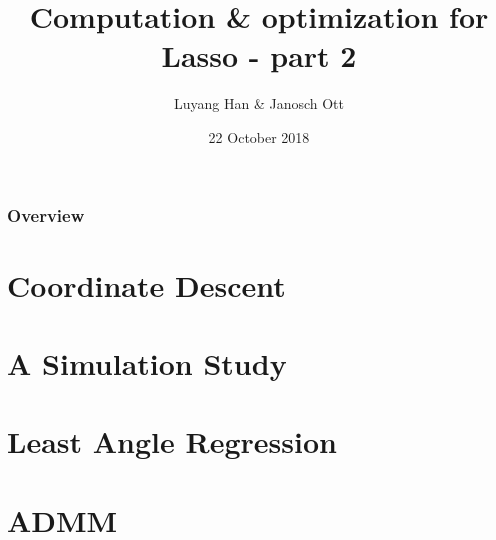 \documentclass{beamer}
\title[Computation \& optimization]{Computation \& optimization for Lasso - part 2} %
\author{Luyang Han \& Janosch Ott} %
\institute[] %
{
ETH Zürich \\ %
}
\date{22 October 2018} %
\begin{document}
\begin{frame}
\titlepage %
\end{frame}

\begin{frame}
\frametitle{Overview} %
\tableofcontents %
\end{frame}


\section{Coordinate Descent}



\section{A Simulation Study}



\section{Least Angle Regression}



\section{ADMM}
\end{document}
